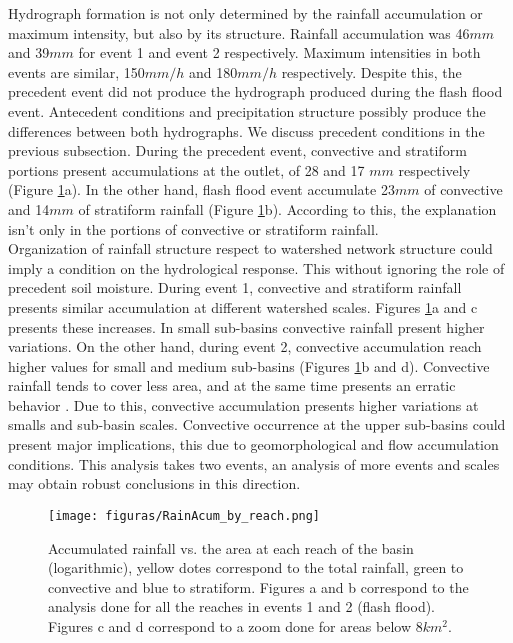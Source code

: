 {Hydrograph formation is not only determined by the rainfall accumulation or maximum intensity, but also by its structure. Rainfall accumulation was 46$mm$ and 39$mm$ for event 1 and event 2 respectively.  Maximum intensities in both events are similar, 150$mm/h$ and 180$mm/h$ respectively.   Despite this, the precedent event did not produce the hydrograph produced during the flash flood event. Antecedent conditions and precipitation structure possibly produce the differences between both hydrographs.  We discuss precedent conditions in the previous subsection. During the precedent event, convective and stratiform portions present accumulations at the outlet, of 28 and 17 $mm$ respectively (Figure \ref{fig:RainAcumByReach}a). In the other hand, flash flood event accumulate 23$mm$ of convective and 14$mm$ of stratiform rainfall (Figure \ref{fig:RainAcumByReach}b).   According to this, the explanation isn't only in the portions of convective or stratiform rainfall.\\   

Organization of rainfall structure respect to watershed network structure could imply a condition on the hydrological response. This without ignoring the role of precedent soil moisture.   During event 1, convective and stratiform rainfall presents similar accumulation at different watershed scales. Figures \ref{fig:RainAcumByReach}a and c presents these increases. In small sub-basins convective rainfall present higher variations. On the other hand, during event 2, convective accumulation reach higher values for small and medium sub-basins (Figures \ref{fig:RainAcumByReach}b and d).   Convective rainfall tends to cover less area, and at the same time presents an erratic behavior \citep{Steiner1995, Houze1989}.   Due to this, convective accumulation presents higher variations at smalls and sub-basin scales.  Convective occurrence at the upper sub-basins could present major implications, this due to geomorphological and flow accumulation conditions.  This analysis takes two events, an analysis of more events and scales may obtain robust conclusions in this direction.\\

\begin{figure}[t]
\centering
 \texttt{[image: figuras/RainAcum\_by\_reach.png]}
 \caption{Accumulated rainfall vs. the area at each reach of the basin (logarithmic), yellow dotes correspond to the total rainfall, green to convective and blue to stratiform. Figures a and b correspond to the analysis done for all the reaches in events 1 and 2 (flash flood). Figures c and d correspond to a zoom done for areas below 8$km^2$.}
    \label{fig:RainAcumByReach}
\end{figure}

}
